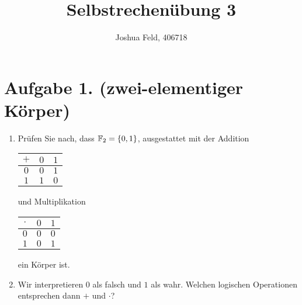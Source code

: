 \documentclass[german,12pt]{homework}
\title{Selbstrechenübung 3}
\author{Joshua Feld, 406718}
\institute{RWTH Aachen University\\Center for Computational Engineering Science}
\newcommand{\FF}{\mathbb{F}}
\DeclarePairedDelimiter{\penbrace}{\{}{\}}
\begin{document}
    \maketitle

    \section*{Aufgabe 1. (zwei-elementiger Körper)}

    \begin{problem}
        \begin{enumerate}
            \item Prüfen Sie nach, dass \(\FF_2 = \penbrace*{0, 1}\),
            ausgestattet mit der Addition \begin{tabular}{c|c|c}
                \(+\) & \(0\) & \(1\)\\
                \hline
                \(0\) & \(0\) & \(1\)\\
                \hline
                \(1\) & \(1\) & \(0\)
            \end{tabular} und Multiplikation \begin{tabular}{c|c|c}
                \(\cdot\) & \(0\) & \(1\)\\
                \hline
                \(0\) & \(0\) & \(0\)\\
                \hline
                \(1\) & \(0\) & \(1\)
            \end{tabular} ein Körper ist.
            \item Wir interpretieren \(0\) als falsch und \(1\) als wahr.
            Welchen logischen Operationen entsprechen dann \(+\) und \(\cdot\)?
        \end{enumerate}


\end{problem}
\end{document}
